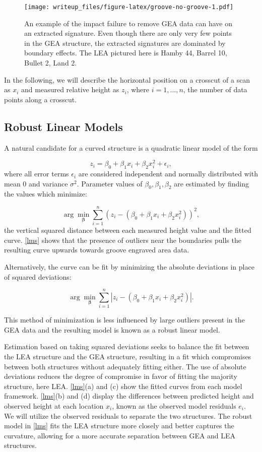 \documentclass[12pt]{article}
\begin{document}
\begin{figure}
\centering
\texttt{[image: writeup\_files/figure-latex/groove-no-groove-1.pdf]}
\caption{\label{groove-no-groove}An example of the impact failure to
remove GEA data can have on an extracted signature. Even though there
are only very few points in the GEA structure, the extracted signatures
are dominated by boundary effects. The LEA pictured here is Hamby 44,
Barrel 10, Bullet 2, Land 2.}
\end{figure}

In the following, we will describe the horizontal position on a crosscut
of a scan as \(x_i\) and measured relative height as \(z_i\), where
\(i = 1, \dots, n\), the number of data points along a crosscut.

\subsection{Robust Linear Models}

A natural candidate for a curved structure is a quadratic linear model
of the form

\[
z_i = \beta_0 + \beta_1x_i + \beta_2 x_i^2 + \epsilon_i,
\] where all error terms \(\epsilon_i\) are considered independent and
normally distributed with mean \(0\) and variance \(\sigma^2\).
Parameter values of \(\beta_0, \beta_1, \beta_2\) are estimated by
finding the values which minimize:

\[\arg\min_{\mathbf{\beta}} \sum_{i=1}^n \left(z_i - (\beta_0 + \beta_1x_i + \beta_2x_i^2)\right)^2,\]
the vertical squared distance between each measured height value and the
fitted curve. \autoref{lms} shows that the presence of outliers near the
boundaries pulls the resulting curve upwards towards groove engraved
area data.

Alternatively, the curve can be fit by minimizing the absolute
deviations in place of squared deviations:

\[\arg\min_{\mathbf{\beta}} \sum_{i=1}^n \left|z_i - (\beta_0 + \beta_1x_i + \beta_2x_i^2) \right|.\]

This method of minimization is less influenced by large outliers present
in the GEA data and the resulting model is known as a robust linear
model.

Estimation based on taking squared deviations seeks to balance the fit
between the LEA structure and the GEA structure, resulting in a fit
which compromises between both structures without adequately fitting
either. The use of absolute deviations reduces the degree of compromise
in favor of fitting the majority structure, here LEA. \autoref{lms}(a)
and (c) show the fitted curves from each model framework.
\autoref{lms}(b) and (d) display the differences between predicted
height and observed height at each location \(x_i\), known as the
observed model residuals \(e_i\). We will utilize the observed residuals
to separate the two structures. The robust model in \autoref{lms} fits
the LEA structure more closely and better captures the curvature,
allowing for a more accurate separation between GEA and LEA structures.
\end{document}
